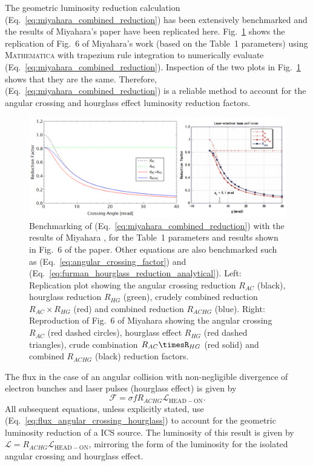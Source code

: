 \documentclass[../main.tex]{subfiles}
\begin{document}
The geometric luminosity reduction calculation (Eq.~\ref{eq:miyahara_combined_reduction}) has been extensively benchmarked and the results of Miyahara's paper \cite{miyahara2008luminosity} have been replicated here. Fig.~\ref{fig:miyahara_benchmarking} shows the replication of Fig.~6 of Miyahara's work \cite{miyahara2008luminosity} (based on the Table~1 parameters) using \textsc{Mathematica} with trapezium rule integration to numerically evaluate (Eq.~\ref{eq:miyahara_combined_reduction}). Inspection of the two plots in Fig.~\ref{fig:miyahara_benchmarking} shows that they are the same. Therefore, (Eq.~\ref{eq:miyahara_combined_reduction}) is a reliable method to account for the angular crossing and hourglass effect luminosity reduction factors. 
\begin{figure}[!h]
\centering
\includegraphics[width=\textwidth]{Figures/Photon_Production_by_Inverse_Compton_Scattering/miyahara_benchmarking.pdf}
\caption{Benchmarking of (Eq.~\ref{eq:miyahara_combined_reduction}) with the results of Miyahara \cite{miyahara2008luminosity}, for the Table~1 parameters and results shown in Fig.~6 of the paper. Other equations are also benchmarked such as (Eq.~\ref{eq:angular_crossing_factor}) and (Eq.~\ref{eq:furman_hourglass_reduction_analytical}). Left: Replication plot showing the angular crossing reduction $R_{AC}$ (black), hourglass reduction $R_{HG}$ (green), crudely combined reduction $R_{AC}\times R_{HG}$ (red) and combined reduction $R_{ACHG}$ (blue). Right: Reproduction of Fig.~6 of Miyahara \cite{miyahara2008luminosity} showing the angular crossing $R_{AC}$ (red dashed circles), hourglass effect $R_{HG}$ (red dashed triangles), crude combination $R_{AC}\timesR_{HG}$ (red solid) and combined $R_{ACHG}$ (black) reduction factors.}
\label{fig:miyahara_benchmarking}
\end{figure}

The flux in the case of an angular collision with non-negligible divergence of electron bunches and laser pulses (hourglass effect) is given by
\begin{equation}
\mathcal{F} = \sigma f R_{ACHG}\mathcal{L}_{\mathrm{HEAD-ON}}.
\label{eq:flux_angular_crossing_hourglass}
\end{equation}
All subsequent equations, unless explicitly stated, use (Eq.~\ref{eq:flux_angular_crossing_hourglass}) to account for the geometric luminosity reduction of a ICS source. The luminosity of this result is given by $\mathcal{L} = R_{ACHG}\mathcal{L}_{\mathrm{HEAD-ON}}$, mirroring the form of the luminosity for the isolated angular crossing and hourglass effect.
\end{document}
